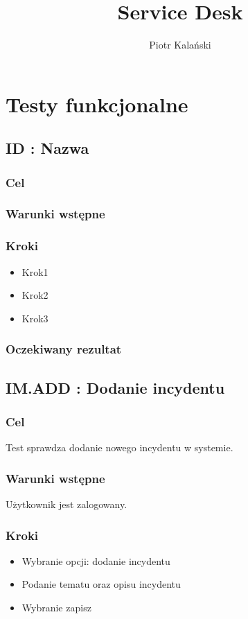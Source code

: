 \documentclass[a4paper, oneside, 11pt]{report}
\title{Service Desk}
\author{Piotr Kalański}
\begin{document}
\maketitle

\tableofcontents

\chapter{Testy funkcjonalne}

\section{ID : Nazwa}
\subsection*{Cel}
\subsection*{Warunki wstępne}
\subsection*{Kroki}
\begin{itemize}
	\item Krok1
	\item Krok2
	\item Krok3
\end{itemize}
\subsection*{Oczekiwany rezultat}

\section{IM.ADD : Dodanie incydentu}
\subsection*{Cel}
Test sprawdza dodanie nowego incydentu w systemie.
\subsection*{Warunki wstępne}
Użytkownik jest zalogowany.
\subsection*{Kroki}
\begin{itemize}
	\item Wybranie opcji: dodanie incydentu
	\item Podanie tematu oraz opisu incydentu
	\item Wybranie zapisz
\end{itemize}
\end{document}
